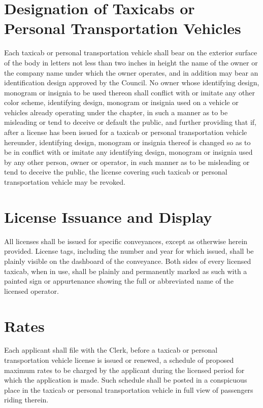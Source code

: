 \section{Designation of Taxicabs or Personal Transportation Vehicles}
Each taxicab or personal transportation vehicle shall bear on the exterior surface of the body in letters not less than two inches in height the name of the owner or the company name under which the owner operates, and in addition may bear an identification design approved by the Council.  No owner whose identifying design, monogram or insignia to be used thereon shall conflict with or imitate any other color scheme, identifying design, monogram or insignia used on a vehicle or vehicles already operating under the chapter, in such a manner as to be misleading or tend to deceive or default the public, and further providing that if, after a license has been issued for a taxicab or personal transportation vehicle hereunder, identifying design, monogram or insignia thereof is changed so as to be in conflict with or imitate any identifying design, monogram or insignia used by any other person, owner or operator, in such manner as to be misleading or tend to deceive the public, the license covering such taxicab or personal transportation vehicle may be revoked.

\section{License Issuance and Display}
All licenses shall be issued for specific conveyances, except as otherwise herein provided.  License tags, including the number and year for which issued, shall be plainly visible on the dashboard of the conveyance.  Both sides of every licensed taxicab, when in use, shall be plainly and permanently marked as such with a painted sign or appurtenance showing the full or abbreviated name of the licensed operator.

\section{Rates}
Each applicant shall file with the Clerk, before a taxicab or personal transportation vehicle license is issued or renewed, a schedule of proposed maximum rates to be charged by the applicant during the licensed period for which the application is made.  Such schedule shall be posted in a conspicuous place in the taxicab or personal transportation vehicle in full view of passengers riding therein.

